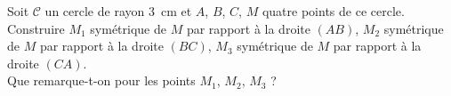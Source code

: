 Soit $\mathscr C$ un cercle de rayon 3~cm et $A$, $B$, $C$, $M$ quatre
points de ce cercle.
\\Construire $M_1$ symétrique de $M$ par rapport à la droite $(AB)$,
$M_2$ symétrique de $M$ par rapport à la droite $(BC)$, $M_3$
symétrique de $M$ par rapport à la droite $(CA)$.
\\Que remarque-t-on pour les points $M_1$, $M_2$, $M_3$ ?
